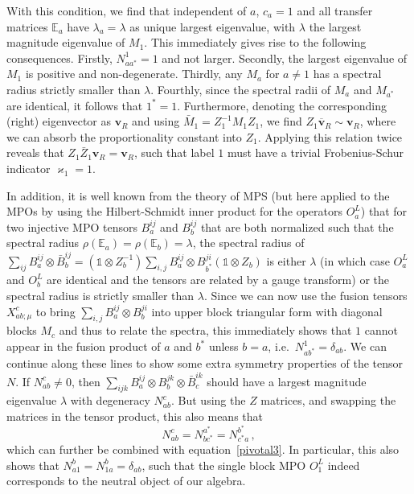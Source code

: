 \documentclass[12 pt]{article}
\begin{document}
With this condition, we find that independent of $a$, $c_a = 1$ and all transfer matrices $\mathbb{E}_{a}$ have $\lambda_a=\lambda$ as unique largest eigenvalue, with $\lambda$ the largest magnitude eigenvalue of $M_1$. This immediately gives rise to the following consequences. Firstly, $N_{aa^*}^{1}=1$ and not larger. Secondly, the largest eigenvalue of $M_1$ is positive and non-degenerate. Thirdly, any $M_{a}$ for $a\neq 1$ has a spectral radius strictly smaller than $\lambda$. Fourthly, since the spectral radii of $M_{a}$ and $M_{a^*}$ are identical, it follows that $1^* = 1$. Furthermore, denoting the corresponding (right) eigenvector as $\mathbf{v}_{R}$ and using $\bar{M}_1 = Z_1^{-1} M_1 Z_{1}$, we find $Z_1 \overline{\mathbf{v}}_{R} \sim \mathbf{v}_{R}$, where we can absorb the proportionality constant into $Z_1$. Applying this relation twice reveals that $Z_1\bar{Z}_1 \mathbf{v}_{R} = \mathbf{v}_{R}$, such that label $1$ must have a trivial Frobenius-Schur indicator $\varkappa_1=1$.

In addition, it is well known from the theory of MPS (but here applied to the MPOs by using the Hilbert-Schmidt inner product for the operators $O_a^L$) that for two injective MPO tensors $B_a^{ij}$ and $B_{b}^{ij}$ that are both normalized such that the spectral radius $\rho(\mathbb{E}_{a}) = \rho(\mathbb{E}_{b}) = \lambda$, the spectral radius of $\sum_{ij} B_{a}^{ij}\otimes \bar{B}_{b}^{ij} = (\mathds{1}\otimes Z_{b}^{-1}) \sum_{i,j} B^{ij}_a \otimes B^{ji}_{b^*} (\mathds{1}\otimes Z_{b})$ is either $\lambda$ (in which case $O_a^L$ and $O_b^L$ are identical and the tensors are related by a gauge transform) or the spectral radius is strictly smaller than $\lambda$. Since we can now use the fusion tensors $X_{ab;\mu}^{c}$ to bring $\sum_{i,j} B^{ij}_a \otimes B^{ji}_{b}$ into upper block triangular form with diagonal blocks $M_c$ and thus to relate the spectra, this immediately shows that $1$ cannot appear in the fusion product of $a$ and $b^*$ unless $b=a$, i.e.\ $N_{ab^*}^{1} = \delta_{ab}$. We can continue along these lines to show some extra symmetry properties of the tensor $N$. If $N_{ab}^{c} \neq 0$, then $\sum_{ijk} B_{a}^{ij}\otimes B_{b}^{jk} \otimes \bar{B}^{ik}_{c}$ should have a largest magnitude eigenvalue $\lambda$ with degeneracy $N_{ab}^{c}$. But using the $Z$ matrices, and swapping the matrices in the tensor product, this also means that
\begin{equation}\label{pivotal}
    N_{ab}^{c} = N^{a^*}_{b c^*} = N_{c^*a}^{b^*}\, ,
\end{equation}
which can further be combined with equation~\eqref{pivotal3}. In particular, this also shows that $N_{a1}^{b} = N_{1a}^{b} = \delta_{ab}$, such that the single block MPO $O_{1}^L$ indeed corresponds to the neutral object of our algebra.
\end{document}
